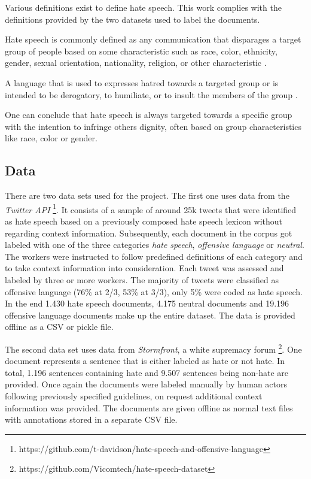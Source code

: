 Various definitions exist to define hate speech. This work complies with the definitions provided by the two datasets used to label the documents. 

\begin{defStrich}
	Hate speech is commonly defined as any communication that disparages a target group of people based on some characteristic such as race, color, ethnicity, gender, sexual orientation, nationality, religion, or other characteristic \cite{DeGibert2020}.
\end{defStrich}

\begin{defStrich}
	A language that is used to expresses hatred towards a targeted group or is intended to be derogatory, to humiliate, or to insult the members of the group \cite{ThomasDavidson2020}.
\end{defStrich}

One can conclude that hate speech is always targeted towards a specific group with the intention to infringe others dignity, often based on group characteristics like race, color or gender. 

\subsection{Data}
\label{ch:approachB}

There are two data sets used for the project. The first one uses data from the \textit{Twitter API} \cite{ThomasDavidson2020}\footnote{https://github.com/t-davidson/hate-speech-and-offensive-language}. It consists of a sample of around 25k tweets that were identified as hate speech based on a previously composed hate speech lexicon without regarding context information. Subsequently, each document in the corpus got labeled with one of the three categories \textit{hate speech}, \textit{offensive language} or \textit{neutral}. The workers were instructed to follow predefined definitions of each category and to take context information into consideration. Each tweet was assessed and labeled by three or more workers. The majority of tweets were classified as offensive language (76\% at 2/3, 53\% at 3/3), only 5\% were coded as hate speech. In the end 1.430 hate speech documents, 4.175 neutral documents and 19.196 offensive language documents make up the entire dataset. The data is provided offline as a CSV or pickle file. 

The second data set uses data from \textit{Stormfront}, a white supremacy forum \cite{DeGibert2020}\footnote{https://github.com/Vicomtech/hate-speech-dataset}. One document represents a sentence that is either labeled as hate or not hate. In total, 1.196 sentences containing hate and 9.507 sentences being non-hate are provided. Once again the documents were labeled manually by human actors following previously specified guidelines, on request additional context information was provided. The documents are given offline as normal text files with annotations stored in a separate CSV file. 

